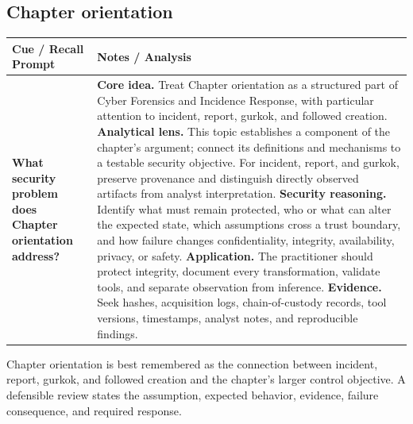 \documentclass[11pt]{article}
\newcommand{\CornellHeader}{%
\rowcolor{Navy}\color{white}\bfseries Cue / Recall Prompt & \color{white}\bfseries Notes / Analysis\\\hline}
\newcommand{\CornellRow}[2]{%
\cellcolor{CueGray}\RaggedRight\textbf{#1} & \RaggedRight #2\\\hline}
\begin{document}
\subsection*{Chapter orientation}
\begin{longtable}{>{\RaggedRight\arraybackslash}p{}|>{\RaggedRight\arraybackslash}p{}}
\CornellHeader
\CornellRow{What security problem does Chapter orientation address?}{\textbf{Core idea.} Treat Chapter orientation as a structured part of Cyber Forensics and Incidence Response, with particular attention to incident, report, gurkok, and followed creation. \textbf{Analytical lens.} This topic establishes a component of the chapter's argument; connect its definitions and mechanisms to a testable security objective. For incident, report, and gurkok, preserve provenance and distinguish directly observed artifacts from analyst interpretation. \textbf{Security reasoning.} Identify what must remain protected, who or what can alter the expected state, which assumptions cross a trust boundary, and how failure changes confidentiality, integrity, availability, privacy, or safety. \textbf{Application.} The practitioner should protect integrity, document every transformation, validate tools, and separate observation from inference. \textbf{Evidence.} Seek hashes, acquisition logs, chain-of-custody records, tool versions, timestamps, analyst notes, and reproducible findings.}
\end{longtable}
\begin{topicsummary}
Chapter orientation is best remembered as the connection between incident, report, gurkok, and followed creation and the chapter's larger control objective. A defensible review states the assumption, expected behavior, evidence, failure consequence, and required response.
\end{topicsummary}
\end{document}
